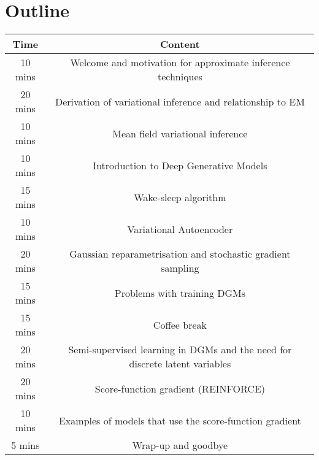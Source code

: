 \section{Outline}

\begin{table}[h!]
\begin{tabular}{|c|c|}
\hline
\textbf{Time} & \textbf{Content} \\
\hline \hline
10 mins & Welcome and motivation for approximate inference techniques \\
20 mins & Derivation of variational inference and relationship to EM \\
10 mins & Mean field variational inference \\
\hline
10 mins & Introduction to Deep Generative Models \\
15 mins & Wake-sleep algorithm \\
10 mins & Variational Autoencoder \\
20 mins & Gaussian reparametrisation and stochastic gradient sampling \\
15 mins & Problems with training DGMs \\
\hline \hline
15 mins & Coffee break \\
\hline \hline
20 mins & Semi-supervised learning in DGMs and the need for discrete latent variables \\
20 mins & Score-function gradient (REINFORCE) \\
10 mins & Examples of models that use the score-function gradient \\
\hline \hline
5 mins & Wrap-up and goodbye \\
\hline
\end{tabular}
\end{table}